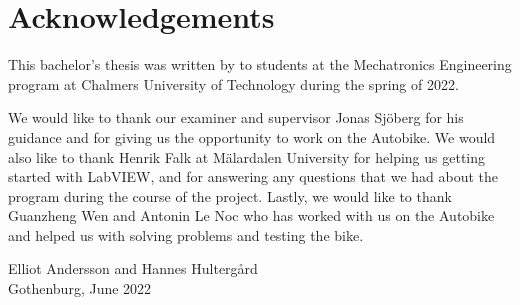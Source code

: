 \thispagestyle{plain}			%
\section*{Acknowledgements}

This bachelor's thesis was written by to students at the Mechatronics Engineering program at Chalmers University of Technology during the spring of 2022.

We would like to thank our examiner and supervisor Jonas Sjöberg for his guidance and for giving us the opportunity to work on the Autobike. We would also like to thank Henrik Falk at Mälardalen University for helping us getting started with LabVIEW, and for answering any questions that we had about the program during the course of the project. Lastly, we would like to thank Guanzheng Wen and Antonin Le Noc who has worked with us on the Autobike and helped us with solving problems and testing the bike.

\vspace{1.5cm}
\begin{flushright}
    Elliot Andersson and Hannes Hultergård\\
    Gothenburg, June 2022
\end{flushright}

\newpage				%
\thispagestyle{empty}
\mbox{}